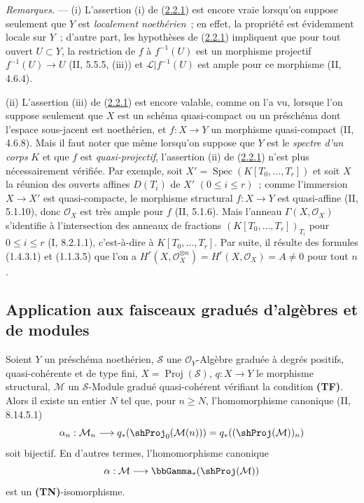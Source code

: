 \begin{env}[2.2.5]
\label{III.2.2.5-fr}
\emph{Remarques.} ---
(i) L'assertion (i) de (\hyperref[III.2.2.1-fr]{2.2.1}) est encore vraie
lorsqu'on suppose seulement que $Y$ est \emph{localement noethérien}~; en
effet, la propriété est évidemment locale sur $Y$~; d'autre part, les
hypothèses de (\hyperref[III.2.2.1-fr]{2.2.1}) impliquent que pour tout
ouvert $U\subset Y$, la restriction de $f$ à $f^{-1}(U)$ est un morphisme
projectif $f^{-1}(U)\to U$ (II, 5.5.5, (iii)) et
$\mathcal L|f^{-1}(U)$ est ample pour ce morphisme (II, 4.6.4).

(ii) L'assertion (iii) de (\hyperref[III.2.2.1-fr]{2.2.1}) est encore
valable, comme on l'a vu, lorsque l'on suppose seulement que $X$ est un
schéma quasi-compact ou un préschéma dont l'espace sous-jacent est
noethérien, et $f:X\to Y$ un morphisme quasi-compact (II, 4.6.8). Mais il
faut noter que même lorsqu'on suppose que $Y$ est le \emph{spectre d'un
corps} $K$ et que $f$ est \emph{quasi-projectif}, l'assertion (ii) de
(\hyperref[III.2.2.1-fr]{2.2.1}) n'est plus nécessairement vérifiée. Par
exemple, soit $X'=\operatorname{Spec}(K[T_0,\ldots,T_r])$ et soit $X$ la
réunion des ouverts affines $D(T_i)$ de $X'$ $(0\leq i\leq r)$~; comme
l'immersion $X\to X'$ est quasi-compacte, le morphisme structural
$f:X\to Y$ est quasi-affine (II, 5.1.10), donc $\mathcal O_X$ est très
ample pour $f$ (II, 5.1.6). Mais l'anneau
$\Gamma(X,\mathcal O_X)$ s'identifie à l'intersection des anneaux de
fractions $(K[T_0,\ldots,T_r])_{T_i}$ pour $0\leq i\leq r$
(I, 8.2.1.1), c'est-à-dire à $K[T_0,\ldots,T_r]$. Par suite, il résulte
des formules (1.4.3.1) et (1.1.3.5) que l'on a
$H^r(X,\mathcal O_X^{\otimes n})=H^r(X,\mathcal O_X)=A\neq0$ pour tout
$n$.
\end{env}

\subsection{Application aux faisceaux gradués d'algèbres et de modules}
\label{subsection:III.2.3-fr}

\begin{theorem}[2.3.1]
\label{III.2.3.1-fr}
Soient $Y$ un préschéma noethérien, $\mathcal S$ une
$\mathcal O_Y$-Algèbre graduée à degrés positifs, quasi-cohérente et de
type fini, $X=\operatorname{Proj}(\mathcal S)$,
$q:X\to Y$ le morphisme structural, $\mathcal M$ un $\mathcal S$-Module
gradué quasi-cohérent vérifiant la condition \textbf{(TF)}. Alors il existe
un entier $N$ tel que, pour $n\geq N$, l'homomorphisme canonique
(II, 8.14.5.1)
\[
\alpha_n:\mathcal M_n\longrightarrow
q_*(\shProj_0(\mathcal M(n)))
=q_*((\shProj(\mathcal M))_n)
\]
soit bijectif. En d'autres termes, l'homomorphisme canonique
\[
\alpha:\mathcal M\longrightarrow\bbGamma_*(\shProj(\mathcal M))
\]
est un \textbf{(TN)}-isomorphisme.
\end{theorem}

